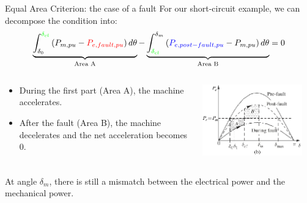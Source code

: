 \begin{frame}[allowframebreaks]{Equal Area Criterion: the case of a fault}
For our short-circuit example, we can decompose the condition into:
$$\underbrace{\int_{\delta_0}^{\mathcolor{green}{\delta_{cl}}} \left(P_{m,pu}-\mathcolor{red}{P_{e,fault,pu}}\right) d\theta}_{\text{Area A}} - \underbrace{\int_{\mathcolor{green}{\delta_{cl}}}^{\delta_{m}} \left(\mathcolor{blue}{P_{e,post-fault,pu}}-P_{m,pu}\right) d\theta}_{\text{Area B}} = 0$$
\begin{columns}
    \begin{column}{0.55\textwidth}
        \begin{itemize}
            \item During the first part (Area A), the machine accelerates. 
            \item After the fault (Area B), the machine decelerates and the net acceleration becomes 0. 
        \end{itemize}
    \end{column}
    \begin{column}{0.45\textwidth}
        \begin{center}
        \includegraphics[width=0.9\textwidth]{images/TransientStabilityEAC_2.png}
        \end{center}
    \end{column}
\end{columns}

\begin{columns}
    \begin{column}{0.5\textwidth}
        At angle $\delta_{m}$, there is still a mismatch between the electrical power and the mechanical power. 
        

\end{column}
\end{columns}
\end{frame}

